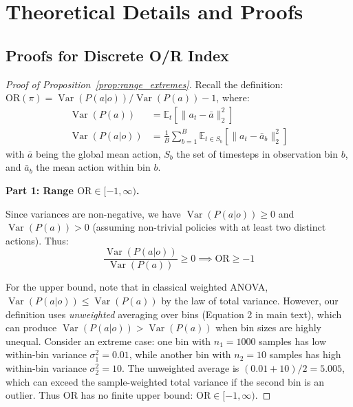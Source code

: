 \documentclass[twoside]{article}
\DeclareMathOperator{\Var}{Var}
\theoremstyle{remark}
\begin{document}

\section{Theoretical Details and Proofs}
\label{app:theory_details}

\subsection{Proofs for Discrete O/R Index}
\label{app:proofs_discrete}

\begin{proof}[Proof of Proposition~\ref{prop:range_extremes}]
Recall the definition: $\mathrm{OR}(\pi) = \Var(P(a|o)) / \Var(P(a)) - 1$, where:
\begin{align}
\Var(P(a)) &= \mathbb{E}_t[\|a_t - \bar{a}\|_2^2] \\
\Var(P(a|o)) &= \frac{1}{B} \sum_{b=1}^{B} \mathbb{E}_{t \in S_b}[\|a_t - \bar{a}_b\|_2^2]
\end{align}
with $\bar{a}$ being the global mean action, $S_b$ the set of timesteps in observation bin $b$, and $\bar{a}_b$ the mean action within bin $b$.

\textbf{Part 1: Range $\mathrm{OR} \in [-1, \infty)$.}

Since variances are non-negative, we have $\Var(P(a|o)) \geq 0$ and $\Var(P(a)) > 0$ (assuming non-trivial policies with at least two distinct actions). Thus:
\begin{equation}
\frac{\Var(P(a|o))}{\Var(P(a))} \geq 0 \implies \mathrm{OR} \geq -1
\end{equation}

For the upper bound, note that in classical weighted ANOVA, $\Var(P(a|o)) \leq \Var(P(a))$ by the law of total variance. However, our definition uses \emph{unweighted} averaging over bins (Equation 2 in main text), which can produce $\Var(P(a|o)) > \Var(P(a))$ when bin sizes are highly unequal. Consider an extreme case: one bin with $n_1 = 1000$ samples has low within-bin variance $\sigma_1^2 = 0.01$, while another bin with $n_2 = 10$ samples has high within-bin variance $\sigma_2^2 = 10$. The unweighted average is $(0.01 + 10)/2 = 5.005$, which can exceed the sample-weighted total variance if the second bin is an outlier. Thus $\mathrm{OR}$ has no finite upper bound: $\mathrm{OR} \in [-1, \infty)$.


\end{proof}
\end{document}
